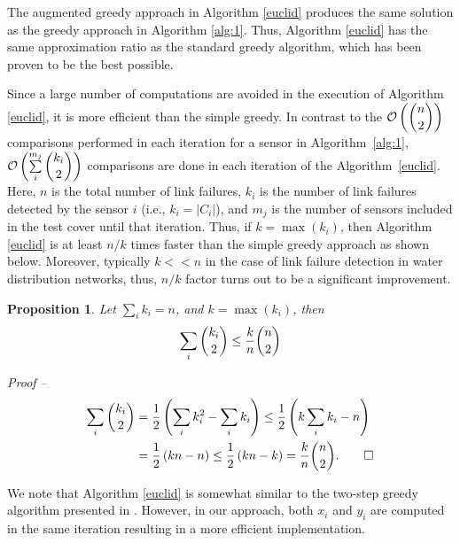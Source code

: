 \documentclass[twocolumn]{autart}
\newtheorem{proposition}[theorem]{\bf Proposition}
\begin{document}
The augmented greedy approach in Algorithm \ref{euclid} produces the same solution as the greedy approach in Algorithm \ref{alg:1}. Thus, Algorithm \ref{euclid} has the same approximation ratio as the standard greedy algorithm, which has been proven to be the best possible.  \vspace{-0.25cm}

Since a large number of computations are avoided in the execution of Algorithm \ref{euclid}, it is more efficient than the simple greedy. In contrast to the $\mathcal{O}\left(\dbinom{n}{2}\right)$ comparisons performed in each iteration for a sensor in Algorithm~\ref{alg:1}, $\mathcal{O}\left(\sum\limits_i^{m_j} \dbinom{k_i}{2}\right)$ comparisons are done in each iteration of the Algorithm~\ref{euclid}. Here, $n$ is the total number of link failures, $k_i$ is the number of link failures detected by the sensor $i$ (i.e., $k_i=|C_i|$), and $m_j$ is the number of sensors included in the test cover until that iteration. Thus, if $k=\max({k_i})$, then Algorithm \ref{euclid} is at least $n/k$ times faster than the simple greedy approach as shown below. Moreover, typically $k<<n$ in the case of link failure detection in water distribution networks, thus, $n/k$ factor turns out to be a significant improvement.
\begin{proposition}
\label{prop:compare}
Let $\sum\limits_i k_i= n$, and $k=\max (k_i)$, then 
\begin{equation}
\label{eq:one}
\sum\limits_{i}{\dbinom{k_i}{2}}\le \frac{k}{n}\dbinom{n}{2}
\end{equation}
\end{proposition}\vspace{-0.35cm}
\textit{Proof --} \vspace{-0.35cm}
\begin{equation*}
\begin{split}
\sum\limits_{i}{\dbinom{k_i}{2}}  & = \frac{1}{2}\left(\sum\limits_i k_i^2 - \sum\limits_i k_i\right) \le \frac{1}{2}\left(k\sum\limits_i k_i -n\right) \\
& = \frac{1}{2}\left(kn - n\right)\le \frac{1}{2}\left(kn-k\right) =\frac{k}{n}\dbinom{n}{2}.\qed
\end{split}
\end{equation*}


We note that Algorithm \ref{euclid} is somewhat similar to the two-step greedy algorithm presented in \cite{Bontriddr1}. However, in our approach, both $x_i$ and $y_i$ are computed in the same iteration resulting in a more efficient implementation.
\end{document}
